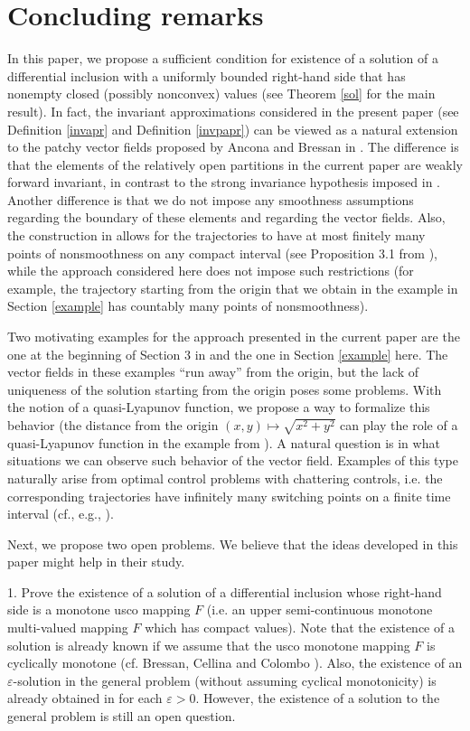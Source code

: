 \documentclass[a4paper]{article}
\begin{document}
\section{Concluding remarks}

In this paper, we propose a sufficient condition for existence of a solution of a differential inclusion with a uniformly bounded right-hand side that has nonempty closed (possibly nonconvex) values (see Theorem \ref{sol} for the main result). In fact, the invariant approximations considered in the present paper (see Definition \ref{invapr} and Definition \ref{invpapr}) can be viewed as a natural extension to the patchy vector fields proposed by Ancona and Bressan in \cite{AB}. The difference is that the elements of the relatively open partitions in the current paper are weakly forward invariant, in contrast to the strong invariance hypothesis imposed in \cite{AB}. Another difference is that we do not impose any smoothness assumptions regarding the boundary of these elements and regarding the vector fields. Also, the construction in \cite{AB} allows for the trajectories to have at most finitely many points of nonsmoothness on any compact interval (see Proposition 3.1 from \cite{AB}), while the approach considered here does not impose such restrictions (for example, the trajectory starting from the origin that we obtain in the example in Section \ref{example} has countably many points of nonsmoothness).

Two motivating examples for the approach presented in the current paper are the one at the beginning of Section 3 in \cite{KR} and the one in Section \ref{example} here. The vector fields in these examples ``run away'' from the origin, but the lack of uniqueness of the solution starting from the origin poses some problems. With the notion of a quasi-Lyapunov function, we propose a way to formalize this behavior (the distance from the origin $(x,y) \mapsto \sqrt{x^2+y^2}$ can play the role of a quasi-Lyapunov function in the example from \cite{KR}).
A natural question is in what situations we can observe such behavior of the vector field. Examples of this type naturally arise from optimal control problems with chattering controls, i.e. the corresponding trajectories have infinitely many switching points on a finite time interval (cf., e.g., \cite{ZB}). 

Next, we propose two open problems. We believe that the ideas developed in this paper might help in their study. 
 
1. Prove the existence of a solution of a differential inclusion whose right-hand side is a monotone usco mapping $F$  (i.e. an upper semi-continuous monotone multi-valued mapping $F$ which has compact values).  Note that the existence of a solution is already known if we assume that the usco monotone mapping $F$ is cyclically monotone (cf.  Bressan, Cellina and Colombo \cite{BCC}). Also, the existence of an $\varepsilon$-solution in the general problem (without assuming  cyclical monotonicity)  is already obtained in \cite{KRT} for each $\varepsilon>0$.   However, the existence of a solution to the general problem is still an open question. 
\end{document}
